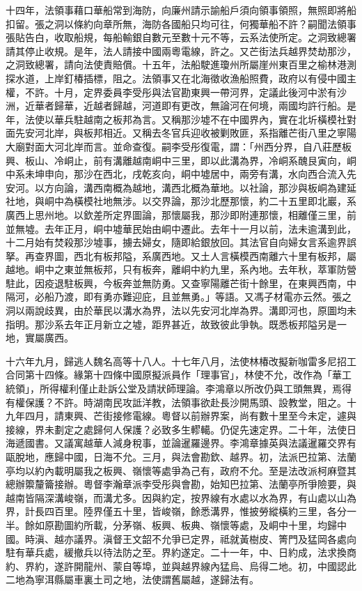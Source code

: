 \begin{pinyinscope}
十四年，法領事藉口華船常到海防，向廉州請示諭船戶須向領事領照，無照即將船扣留。張之洞以條約向章所無，海防各國船只均可往，何獨華船不許？嗣聞法領事張貼告白，收取船規，每船輸銀自數元至數十元不等，云系法使所定。之洞致總署請其停止收規。是年，法人請接中國兩粵電線，許之。又芒街法兵越界焚劫那沙，之洞致總署，請向法使責賠償。十五年，法船駛進瓊州所屬崖州東百里之榆林港測探水道，上岸釘椿插標，阻之。法領事又在北海徵收漁船照費，政府以有侵中國主權，不許。十月，定界委員李受彤與法官勘東興一帶河界，定議此後河中淤有沙洲，近華者歸華，近越者歸越，河道即有更改，無論河在何境，兩國均許行船。是年，法使以華兵駐越南之板邦為言。又稱那沙墟不在中國界內，實在北圻橫模社對面先安河北岸，與板邦相近。又稱去冬官兵迎收被剿敗匪，系指離芒街八里之寧陽大廟對面大河北岸而言。並命查復。嗣李受彤復電，謂：「州西分界，自八莊歷板興、板山、冷峒止，前有溝離越南峒中三里，即以此溝為界，冷峒系醜艮寅向，峒中系未坤申向，那沙在西北，戌乾亥向，峒中墟居中，兩旁有溝，水向西合流入先安河。以方向論，溝西南概為越地，溝西北概為華地。以社論，那沙與板峒為建延社地，與峒中為橫模社地無涉。以交界論，那沙北歷那懷，約二十五里即北巖，系廣西上思州地。以欽差所定界圖論，那懷屬我，那沙即附連那懷，相離僅三里，前並無墟。去年正月，峒中墟華民始由峒中遷此。去年十一月以前，法未逾溝到此，十二月始有焚殺那沙墟事，擄去婦女，隨即給銀放回。其法官自向婦女言系逾界誤拏。再查界圖，西北有板邦隘，系廣西地。又土人言橫模西南離六十里有板邦，屬越地。峒中之東並無板邦，只有板奔，離峒中約九里，系內地。去年秋，萃軍防營駐此，因疫退駐板興，今板奔並無防勇。又查寧陽離芒街十餘里，在東興西南，中隔河，必船乃渡，即有勇亦難迎庇，且並無勇。」等語。又馮子材電亦云然。張之洞以兩說歧異，由於華民以溝水為界，法以先安河北岸為界。溝即河也，原圖均未指明。那沙系去年正月新立之墟，距界甚近，故致彼此爭執。既悉板邦隘另是一地，實屬廣西。

十六年九月，歸逃人魏名高等十八人。十七年八月，法使林椿改擬新咖雷多尼招工合同第十四條。緣第十四條中國原擬派員作「理事官」，林使不允，改作為「華工統領」，所得權利僅止赴訴公堂及請狀師理論。李鴻章以所改仍與工頭無異，焉得有權保護？不許。時湖南民攻詆洋教，法領事欲赴長沙開馬頭、設教堂，阻之。十九年四月，請東興、芒街接修電線。粵督以前辦界案，尚有數十里至今未定，遽與接線，界未劃定之處歸何人保護？必致多生轇轕。仍促先速定界。二十年，法使日海遞國書。又議寓越華人減身稅事，並論暹羅邊界。李鴻章據英與法議暹羅交界有甌脫地，應歸中國，日海不允。三月，與法會勘欽、越界。初，法派巴拉第、法蘭亭均以約內載明屬我之板興、嶺懷等處爭為己有，政府不允。至是法改派柯麻暨其總辦籞釐籥接辦。粵督李瀚章派李受彤與會勘，始知巴拉第、法蘭亭所爭險要，與越南皆隔深溝峻嶺，而溝尤多。因與約定，按界線有水處以水為界，有山處以山為界，計長四百里。陸界僅五十里，皆峻嶺，餘悉溝界，惟披勞縱橫約三里，各分一半。餘如原勘圖約所載，分茅嶺、板興、板典、嶺懷等處，及峒中十里，均歸中國。時滇、越亦議界。滇督王文韶不允爭已定界，祗就黃樹皮、箐門及猛岡各處向駐有華兵處，緩撤兵以待法防之至。界約遂定。二十一年，中、日約成，法求換商約、界約，遂許開龍州、蒙自等埠，並與越界線內猛烏、烏得二地。初，中國認此二地為寧洱縣屬車裏土司之地，法使謂舊屬越，遂歸法有。


\end{pinyinscope}
